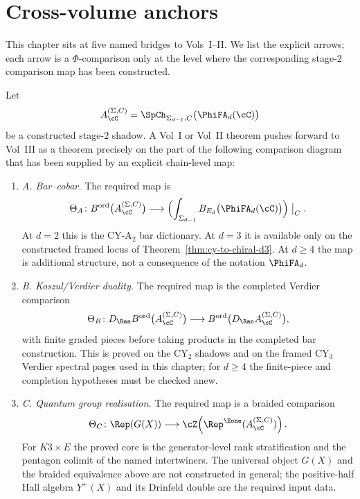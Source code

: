 \section{Cross-volume anchors}
\label{sec:modular-koszul-anchors}

This chapter sits at five named bridges to Vols~I--II. We list the
explicit arrows; each arrow is a \(\Phi\)-comparison only at the level
where the corresponding stage-$2$ comparison map has been constructed.

\begin{theorem}
\label{thm:cross-volume-comparison-criterion}
Let
\[
 A_{\cC}^{(\Sigma,C)}
 =
 \SpCh_{\Sigma_{d-1},C}\bigl(\PhiFA_d(\cC)\bigr)
\]
be a constructed stage-$2$ shadow. A Vol~I or Vol~II theorem
pushes forward to Vol~III as a theorem precisely on the part of the
following comparison diagram that has been supplied by an explicit
chain-level map:
\begin{enumerate}[label=\textup{(\alph*)}]
\item \emph{A. Bar--cobar.}
The required map is
\[
 \Theta_A\colon
 B^{\mathrm{ord}}\bigl(A_{\cC}^{(\Sigma,C)}\bigr)
 \longrightarrow
 \Bigl(\int_{\Sigma_{d-1}}
 B_{E_d}\bigl(\PhiFA_d(\cC)\bigr)\Bigr)\bigm|_C .
\]
At $d=2$ this is the CY-A$_2$ bar dictionary. At $d=3$ it is available
only on the constructed framed locus of Theorem~\ref{thm:cy-to-chiral-d3}.
At $d\geq4$ the map is additional structure, not a consequence of
the notation $\PhiFA_d$.

\item \emph{B. Koszul/Verdier duality.}
The required map is the completed Verdier comparison
\[
 \Theta_B\colon
 D_{\Ran}B^{\mathrm{ord}}\bigl(A_{\cC}^{(\Sigma,C)}\bigr)
 \longrightarrow
 B^{\mathrm{ord}}\bigl(D_{\Ran}A_{\cC}^{(\Sigma,C)}\bigr),
\]
with finite graded pieces before taking products in the completed bar
construction. This is proved on the CY$_2$ shadows and on the framed
CY$_3$ Verdier spectral pages used in this chapter; for $d\geq4$ the
finite-piece and completion hypotheses must be checked anew.

\item \emph{C. Quantum group realisation.}
The required map is a braided comparison
\[
 \Theta_C\colon
 \Rep(G(X))
 \longrightarrow
 \cZ\!\left(\Rep^{\Eone}(A_{\cC}^{(\Sigma,C)})\right).
\]
For $K3\times E$ the proved core is the generator-level
rank stratification and the pentagon colimit of the named intertwiners.
The universal object $G(X)$ and the braided equivalence above are not
constructed in general; the positive-half Hall algebra $Y^+(X)$ and its
Drinfeld double are the required input data.


\end{enumerate}
\end{theorem}
